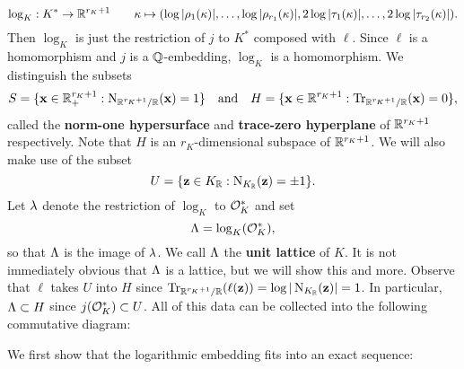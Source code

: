     \[
      \log_{K}:K^{\ast} \to \mathbb{R}^{r_{K}+1} \qquad \kappa \mapsto (\log|\rho_{1}(\kappa)|,\ldots,\log|\rho_{r_{1}}(\kappa)|,2\log|\tau_{1}(\kappa)|,\ldots,2\log|\tau_{r_{2}}(\kappa)|).
    \]
    Then $\log_{K}$ is just the restriction of $j$ to $K^{\ast}$ composed with $\ell$. Since $\ell$ is a homomorphism and $j$ is a $\mathbb{Q}$-embedding, $\log_{K}$ is a homomorphism. We distinguish the subsets
    \[
      S = \{\mathbf{x} \in  \mathbb{R}_{+}^{r_{K}+1}:\operatorname{\mathrm{N}}_{\mathbb{R}^{r_{K}+1}/\mathbb{R}}(\mathbf{x}) = 1\} \quad \text{and} \quad H = \{\mathbf{x} \in \mathbb{R}^{r_{K}+1}:\operatorname{\mathrm{Tr}}_{\mathbb{R}^{r_{K}+1}/\mathbb{R}}(\mathbf{x}) = 0\},
    \]
    called the \textbf{norm-one hypersurface} and \textbf{trace-zero hyperplane} of $\mathbb{R}^{r_{K}+1}$ respectively. Note that $H$ is an $r_{K}$-dimensional subspace of $\mathbb{R}^{r_{K}+1}$. We will also make use of the subset
    \[
      U = \{\mathbf{z} \in K_{\mathbb{R}}:\operatorname{\mathrm{N}}_{K_{\mathbb{R}}}(\mathbf{z}) = \pm 1\}.
    \]
    Let $\lambda$ denote the restriction of $\log_{K}$ to $\mathcal{O}_{K}^{\ast}$ and set
    \[
      \Lambda = \log_{K}(\mathcal{O}_{K}^{\ast}),
    \]
    so that $\Lambda$ is the image of $\lambda$. We call $\Lambda$ the \textbf{unit lattice} of $K$. It is not immediately obvious that $\Lambda$ is a lattice, but we will show this and more. Observe that $\ell$ takes $U$ into $H$ since $\operatorname{\mathrm{Tr}}_{\mathbb{R}^{r_{K}+1}/\mathbb{R}}(\ell(\mathbf{z})) = \log|\operatorname{\mathrm{N}}_{K_{\mathbb{R}}}(\mathbf{z})| = 1$. In particular, $\Lambda \subset H$ since $j(\mathcal{O}_{K}^{\ast}) \subset U$. All of this data can be collected into the following commutative diagram:

    \begin{center}
    \end{center}
    We first show that the logarithmic embedding fits into an exact sequence:

